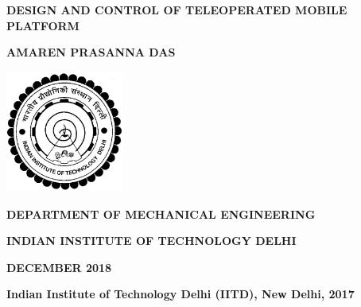 \doublespacing
\thispagestyle{empty}
\begin{center}



\textbf{\large{DESIGN AND CONTROL OF TELEOPERATED MOBILE PLATFORM}}

\bigskip
\bigskip
\bigskip
\bigskip
\bigskip
\bigskip
\bigskip
\bigskip
\bigskip
\bigskip

\textbf{AMAREN PRASANNA DAS}

\bigskip
\bigskip
\bigskip
\bigskip
\bigskip
\bigskip
\bigskip
\bigskip
\bigskip
\bigskip
\bigskip
\bigskip
\bigskip
\bigskip
\bigskip
\bigskip
\bigskip
\bigskip
\bigskip
\bigskip
\bigskip

\includegraphics[height=4cm]{Misc_front/iitlogo.eps}

\bigskip
\bigskip
\bigskip
\bigskip
\bigskip
\bigskip

\textbf{DEPARTMENT OF MECHANICAL ENGINEERING}

\textbf{INDIAN INSTITUTE OF TECHNOLOGY DELHI}

\textbf{DECEMBER 2018}



\end{center}
\newpage
\thispagestyle{empty}
\vspace*{\fill}
\textbf{ \textcopyright Indian Institute of Technology Delhi (IITD), New Delhi, 2017}
\vspace*{\fill}
\mbox{}

